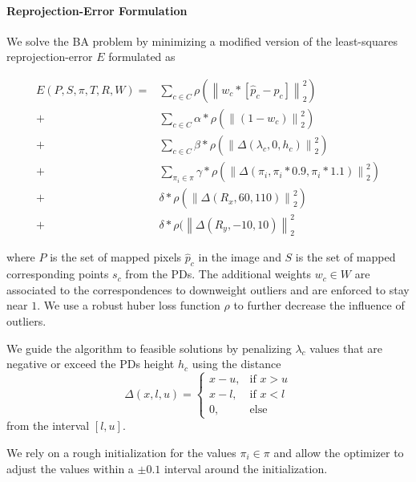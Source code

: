 \paragraph{Reprojection-Error Formulation}
\label{sec:static_calibration_rerpojection_error}
We solve the BA problem by minimizing a modified version of the least-squares reprojection-error $E$ formulated as

\begin{equation}
  \begin{split}
  E(P, S, \pi, T, R, W ) =& 
  \sum_{c \in C} 
  \rho(\left\lVert 
    w_c * [ \hat{p}_c - p_c ]
  \right\rVert^2_2) \\ 
  +& 
  \sum_{c \in C} 
  \alpha * 
  \rho(\left\lVert 
  (1 - w_c)
  \right\rVert^2_2) \\ 
  +& 
  \sum_{c \in C} 
  \beta * 
  \rho(\left\lVert 
  \Delta(\lambda_c, 0, h_c)
  \right\rVert^2_2) \\ 
  +& 
  \sum_{\pi_i \in \pi} 
  \gamma *
  \rho(\left\lVert 
  \Delta (\pi_i, \pi_i * 0.9, \pi_i * 1.1)
  \right\rVert^2_2) \\
  +&
  \delta * 
  \rho(\left\lVert 
  \Delta (R_x, 60, 110)
  \right\rVert^2_2) \\
  +&
  \delta * 
  \rho(\left\lVert 
  \Delta (R_y, -10, 10)
  \right\rVert^2_2 
\end{split}
\label{eq:static_calibration_rerpojection_error}
\end{equation}

where $P$ is the set of mapped pixels $\hat{p}_c$ in the image and $S$ is the set of mapped corresponding points $s_c$ from the PDs.  
The additional weights $w_c \in W$ are associated to the correspondences to downweight outliers and are enforced to stay near $1$.
We use a robust huber loss function $\rho$ to further decrease the influence of outliers.

We guide the algorithm to feasible solutions by penalizing $\lambda_c$ values that are negative or exceed the PDs height $h_c$ using the distance 
\begin{equation}
    \Delta (x, l, u) =
    \begin{cases}
      x - u,& \text{if } x > u\\
      x - l,& \text{if } x < l\\
      0,    & \text{else}
    \end{cases} 
\end{equation}
from the interval $[l, u]$.

We rely on a rough initialization for the values $\pi_i \in \pi$ and allow the optimizer to adjust the values within a $\pm 0.1$ interval around the initialization. 

